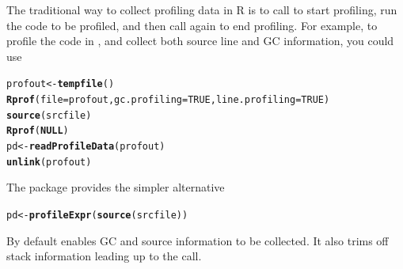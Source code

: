 \documentclass[nojss]{jss}\usepackage[]{graphicx}\usepackage[]{color}
\makeatletter
\newcommand{\hlnum}[1]{\textcolor[rgb]{0.686,0.059,0.569}{#1}}%
\newcommand{\hlstd}[1]{\textcolor[rgb]{0.345,0.345,0.345}{#1}}%
\newcommand{\hlkwa}[1]{\textcolor[rgb]{0.161,0.373,0.58}{\textbf{#1}}}%
\newcommand{\hlkwb}[1]{\textcolor[rgb]{0.69,0.353,0.396}{#1}}%
\newcommand{\hlkwc}[1]{\textcolor[rgb]{0.333,0.667,0.333}{#1}}%
\newcommand{\hlkwd}[1]{\textcolor[rgb]{0.737,0.353,0.396}{\textbf{#1}}}%
\newenvironment{kframe}{%
 \def\at@end@of@kframe{}%
 \ifinner\ifhmode%
  \def\at@end@of@kframe{\end{minipage}}%
  \begin{minipage}{\columnwidth}%
 \fi\fi%
 \def\FrameCommand##1{\hskip\@totalleftmargin \hskip-\fboxsep
 \colorbox{shadecolor}{##1}\hskip-\fboxsep
     \hskip-\linewidth \hskip-\@totalleftmargin \hskip\columnwidth}%
 \MakeFramed {\advance\hsize-\width
   \@totalleftmargin\z@ \linewidth\hsize
   \@setminipage}}%
 {\par\unskip\endMakeFramed%
 \at@end@of@kframe}
\newenvironment{knitrout}{}{} %
\makeatother
\begin{document}
The traditional way to collect profiling data in R is to call
 to start profiling, run the code to be profiled, and then
call  again to end profiling. For example, to profile the
code in , and collect both source line and GC
information, you could use
\begin{knitrout}\small
{}\color{fgcolor}\begin{kframe}
\begin{alltt}
\hlstd{profout} \hlkwb{<-} \hlkwd{tempfile}\hlstd{()}
\hlkwd{Rprof}\hlstd{(}\hlkwc{file} \hlstd{= profout,} \hlkwc{gc.profiling} \hlstd{=} \hlnum{TRUE}\hlstd{,} \hlkwc{line.profiling} \hlstd{=} \hlnum{TRUE}\hlstd{)}
\hlkwd{source}\hlstd{(srcfile)}
\hlkwd{Rprof}\hlstd{(}\hlkwa{NULL}\hlstd{)}
\hlstd{pd} \hlkwb{<-} \hlkwd{readProfileData}\hlstd{(profout)}
\hlkwd{unlink}\hlstd{(profout)}
\end{alltt}
\end{kframe}
\end{knitrout}
The  package provides the simpler alternative
\begin{knitrout}\small
{}\color{fgcolor}\begin{kframe}
\begin{alltt}
\hlstd{pd} \hlkwb{<-} \hlkwd{profileExpr}\hlstd{(}\hlkwd{source}\hlstd{(srcfile))}
\end{alltt}
\end{kframe}
\end{knitrout}
By default  enables GC and source information to be
collected. It also trims off stack information leading up to the
 call.
\end{document}
